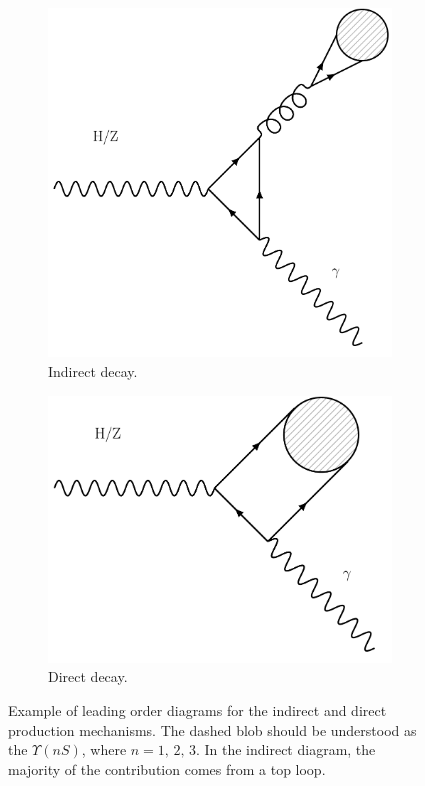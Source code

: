 \begin{figure}[htbp]
  \centering
  \begin{subfigure}[htbp]{0.4\textwidth}
    \centering
    \includegraphics[width=\textwidth]{figures_and_tables/theory/diagrams/indirect}
    \caption{Indirect decay.}
    \label{indirect}
  \end{subfigure}
  \hfill
  \begin{subfigure}[htbp]{0.4\textwidth}
    \centering
    \includegraphics[width=\textwidth]{figures_and_tables/theory/diagrams/direct}
    \caption{Direct decay.}
    \label{direct}
  \end{subfigure}
  \caption{Example of leading order diagrams for the indirect and direct production mechanisms. The dashed blob should be understood as the $\Upsilon(nS)$, where $n=\text{1, 2, 3}$. In the indirect diagram, the majority of the contribution comes from a top loop.}
  \label{direct_indirect}
\end{figure}


